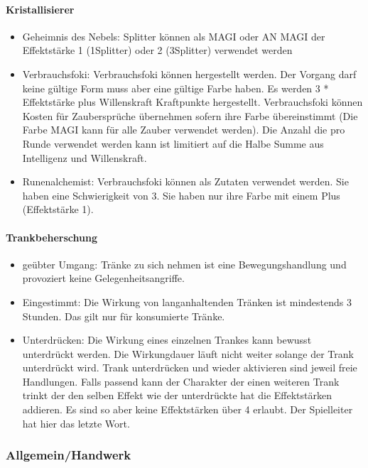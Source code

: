 \documentclass{article}
\begin{document}
\paragraph{Kristallisierer}

\begin{itemize}
\item Geheimnis des Nebels: Splitter können als MAGI oder AN MAGI der Effektstärke 1 (1Splitter) oder 2 (3Splitter) verwendet werden
\item Verbrauchsfoki: Verbrauchsfoki können hergestellt werden. Der Vorgang darf keine gültige Form muss aber eine gültige Farbe haben. Es werden 3 * Effektstärke plus Willenskraft Kraftpunkte hergestellt. Verbrauchsfoki können Kosten für Zaubersprüche übernehmen sofern ihre Farbe übereinstimmt (Die Farbe MAGI kann für alle Zauber verwendet werden). Die Anzahl die pro Runde verwendet werden kann ist limitiert auf die Halbe Summe aus Intelligenz und Willenskraft.
\item Runenalchemist: Verbrauchsfoki können als Zutaten verwendet werden. Sie haben eine Schwierigkeit von 3. Sie haben nur ihre Farbe mit einem Plus (Effektstärke 1).
\end{itemize}

\paragraph{Trankbeherschung}

\begin{itemize}
\item geübter Umgang: Tränke zu sich nehmen ist eine Bewegungshandlung und provoziert keine Gelegenheitsangriffe.
\item Eingestimmt: Die Wirkung von langanhaltenden Tränken ist mindestends 3 Stunden. Das gilt nur für konsumierte Tränke.
\item Unterdrücken: Die Wirkung eines einzelnen Trankes kann bewusst unterdrückt werden. Die Wirkungdauer läuft nicht weiter solange der Trank unterdrückt wird. Trank unterdrücken und wieder aktivieren sind jeweil freie Handlungen. Falls passend kann der Charakter der einen weiteren Trank trinkt der den selben Effekt wie der unterdrückte hat die Effektstärken addieren. Es sind so aber keine Effektstärken über 4 erlaubt. Der Spielleiter hat hier das letzte Wort.
\end{itemize}

\subsubsection{Allgemein/Handwerk}
\end{document}
